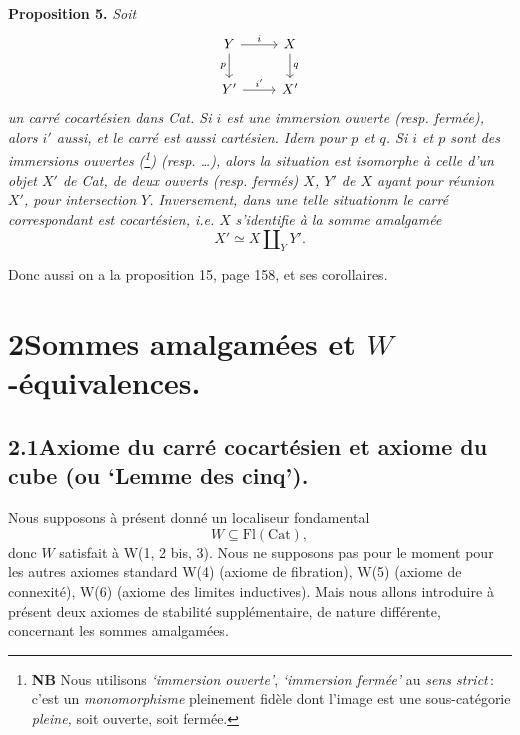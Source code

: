 \textbf{Proposition 5.} \textit{Soit}
\[
\begin{tikzcd}
Y \arrow[r, "i"] \arrow[d, "p"'] & X \arrow[d, "q"] \\
Y' \arrow[r, "i'"] & X'
\end{tikzcd}
\]
\textit{un carré cocartésien dans \textup{Cat}. Si $i$ est une immersion ouverte (resp. fermée), alors $i'$ aussi, et le carré est aussi cartésien. Idem pour $p$ et $q$. Si $i$ et $p$ sont des immersions ouvertes (\footnote{\textbf{NB} Nous utilisons \textit{`immersion ouverte'}, \textit{`immersion fermée'} au \textit{sens strict}\,: c'est un \textit{monomorphisme} pleinement fidèle dont l'image est une sous-catégorie \textit{pleine,} soit ouverte, soit fermée.}) (resp. \dots), alors la situation est isomorphe à celle d'un objet $X'$ de \textup{Cat}, de deux ouverts (resp. fermés) $X$, $Y'$ de $X$ ayant pour réunion $X'$, pour intersection} %
\textit{$Y$. Inversement, dans une telle situationm le carré correspondant est cocartésien, i.e. $X$} %
 \textit{s'identifie à la somme amalgamée}
\[
X'\simeq X\amalg_{Y}Y'.
\]

Donc aussi on a la proposition 15, page 158, et ses corollaires.


\section*{2\quad Sommes amalgamées et $W$-équivalences.}

\subsection*{2.1\quad Axiome du carré cocartésien et axiome du cube (ou `Lemme des cinq').}

Nous supposons à présent donné un localiseur fondamental
\[
W\subseteq\mathrm{Fl}(\mathrm{Cat}),
\]
donc $W$ satisfait à W(1, 2 bis, 3). Nous ne supposons pas pour le moment pour les autres axiomes standard W(4) (axiome de fibration), W(5) (axiome de connexité), W(6) (axiome des limites inductives). Mais nous allons introduire à présent deux axiomes de stabilité supplémentaire, de nature différente, concernant les sommes amalgamées.

